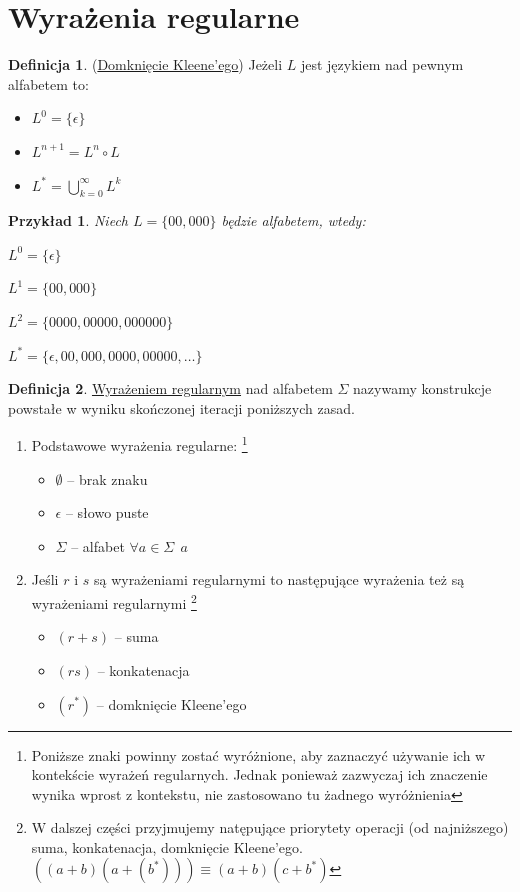 \documentclass[12pt,a4paper]{article}
\newtheorem{przyklad}{Przykład}
\theoremstyle{definition}
\newtheorem{df}{Definicja}
\theoremstyle{remark}
\begin{document}
\section{Wyrażenia regularne}
	
	\begin{df}(\href{http://pl.wikipedia.org/wiki/Domkni%C4%99cie_Kleene'ego}{Domknięcie Kleene'ego})
	Jeżeli $L$ jest językiem nad pewnym alfabetem to:
		\begin{itemize}
			\item $L^0 = \{\epsilon\}$
			\item $L^{n+1} = L^n \circ L$
			\item $L^* = \bigcup\limits_{k=0}^\infty L^k$
		\end{itemize}
	\end{df}	
	
	\begin{przyklad}
		Niech $L = \{00, 000\}$ będzie alfabetem, wtedy:\\
		\begin{inparaenum} 
			\item $L^0 = \{\epsilon\}$
			\item $L^1 = \{00, 000\}$
			\item $L^2 = \{0000, 00000, 000000\}$
			\item $L^* = \{\epsilon, 00, 000, 0000, 00000, \dots\}$
		\end{inparaenum}
	\end{przyklad}
	
	\begin{df} \href{http://pl.wikipedia.org/wiki/Wyra%C5%BCenia_regularne}{Wyrażeniem regularnym} nad alfabetem $\Sigma$ nazywamy konstrukcje
	 powstałe w wyniku skończonej iteracji poniższych zasad.
		\begin{enumerate}
			\item Podstawowe wyrażenia regularne: \footnote{Poniższe znaki powinny zostać wyróżnione, aby zaznaczyć używanie ich w kontekście
			wyrażeń regularnych. Jednak ponieważ zazwyczaj ich znaczenie wynika wprost z kontekstu, nie zastosowano tu żadnego wyróżnienia}
				\begin{itemize}
					\item $\emptyset$ -- brak znaku
					\item $\epsilon$ -- słowo puste
					\item $\Sigma$ -- alfabet $\forall a\in\Sigma ~~ a$
				\end{itemize}
			\item Jeśli $r$ i $s$ są wyrażeniami regularnymi to następujące wyrażenia też są wyrażeniami regularnymi
				\footnote{W dalszej części przyjmujemy natępujące priorytety operacji (od najniższego) suma, konkatenacja, domknięcie Kleene'ego. 
				$((a+b)(a+(b^*))) \equiv (a+b)(c+b^*)$}
				\begin{itemize}
					\item $(r+s)$ -- suma
					\item $(rs)$ -- konkatenacja
					\item $(r^*)$ -- domknięcie Kleene'ego
				\end{itemize}
		\end{enumerate}		
	\end{df}	
	
\end{document}
